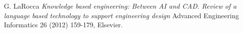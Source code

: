 \documentclass [11pt]{book}
\begin{document}
\backmatter

\begin{thebibliography}{1}

 G. LaRocca \emph{Knowledge based engineering: Between AI
and CAD. Review of a language based technology to support engineering design} 
Advanced Engineering Informatics 26 (2012) 159-179, Elsevier.

\end{thebibliography}


\printindex
\end{document}
